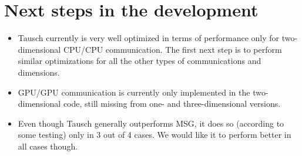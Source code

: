 \documentclass{article}
\begin{document}
\section{Next steps in the development}

\begin{itemize}
    \item Tausch currently is very well optimized in terms of performance only for two-dimensional CPU/CPU communication. The first next step is to perform similar optimizations for all the other types of communications and dimensions.
    \item GPU/GPU communication is currently only implemented in the two-dimensional code, still missing from one- and three-dimensional versions.
    \item Even though Tausch generally outperforms MSG, it does so (according to some testing) only in 3 out of 4 cases. We would like it to perform better in all cases though.
\end{itemize}
\end{document}
